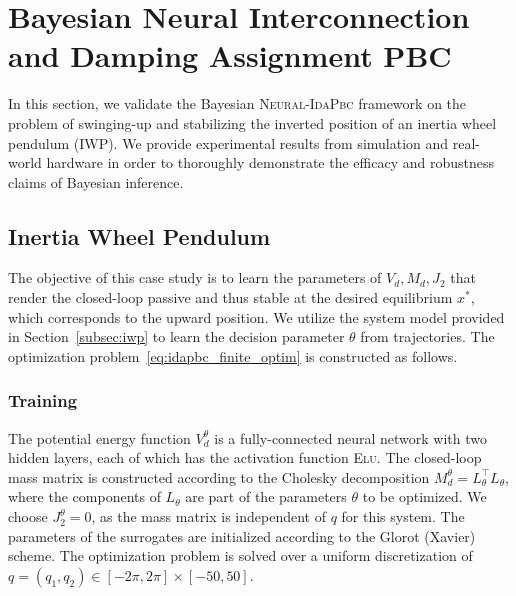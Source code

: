 
\section{Bayesian Neural Interconnection and Damping Assignment PBC}

In this section, we validate the Bayesian \textsc{Neural-IdaPbc} framework on the
problem of swinging-up and stabilizing the inverted position of an inertia wheel
pendulum (IWP). 
%
We provide experimental results from simulation and real-world hardware in order
to thoroughly demonstrate the efficacy and robustness claims of Bayesian
inference.
\subsection{Inertia Wheel Pendulum}

The objective of this case study is to learn the parameters of $V_d, M_d, J_2$
that render the closed-loop passive and thus stable at the desired equilibrium
$x^*$, which corresponds to the upward position.
%
We utilize the system model provided in Section~\ref{subsec:iwp} to learn the decision
parameter $\theta$ from trajectories.
%
The optimization problem~\eqref{eq:idapbc_finite_optim} is constructed as
follows. 

\subsubsection{Training}

The potential energy function $V_d^\theta$ is a fully-connected neural
network with two hidden layers, each of which has the activation function
\textsc{Elu}.
%
The closed-loop mass matrix is constructed according to the Cholesky
decomposition $M_d^\theta = L^\top_\theta L_\theta$, where the components of
$L_\theta$ are part of the parameters $\theta$ to be optimized.
%
We choose $J_2^\theta = 0$, as the mass matrix is independent of $q$ for
this system.
%
The parameters of the surrogates are initialized according to the Glorot
(Xavier)~\cite{glorot2010understanding} scheme.
%
The optimization problem is solved over a uniform discretization of $q = \left(
q_1, q_2 \right) \in [-2\pi, 2\pi] \times [-50, 50]$.


